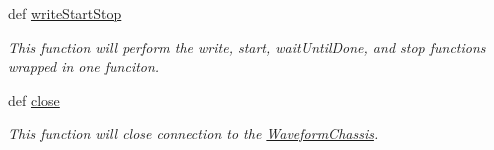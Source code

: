 \begin{DoxyCompactItemize}
def \hyperlink{class_waveform_chassis_1_1_waveform_chassis_acd992cff6a8139f97bdb8e4c9a083b03}{write\-Start\-Stop}
\begin{DoxyCompactList}\small\item\em This function will perform the write, start, wait\-Until\-Done, and stop functions wrapped in one funciton. \end{DoxyCompactList}\item 
def \hyperlink{class_waveform_chassis_1_1_waveform_chassis_a878b267f7ee8b1146c3f0137f18fda00}{close}
\begin{DoxyCompactList}\small\item\em This function will close connection to the \hyperlink{class_waveform_chassis_1_1_waveform_chassis}{Waveform\-Chassis}. \end{DoxyCompactList}\end{DoxyCompactItemize}
